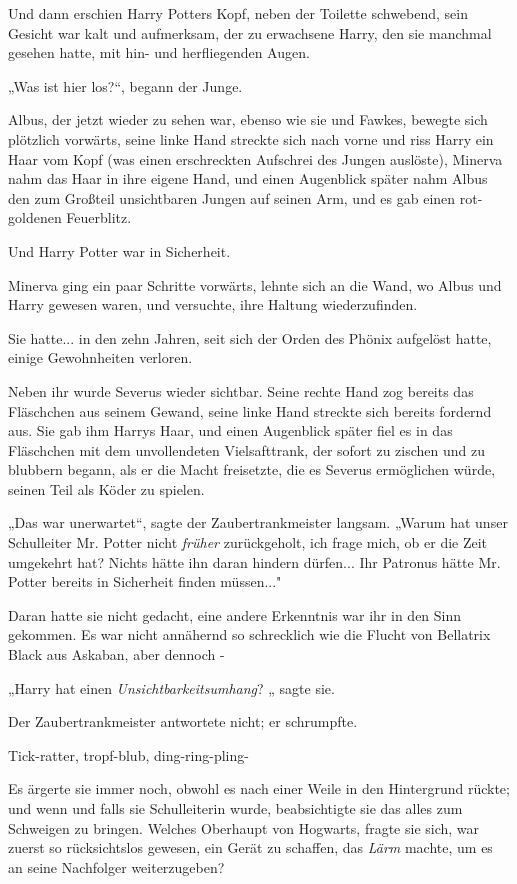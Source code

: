 {Und dann erschien Harry Potters Kopf, neben der Toilette schwebend, sein Gesicht war kalt und aufmerksam, der zu erwachsene Harry, den sie manchmal gesehen hatte, mit hin- und herfliegenden Augen.

„Was ist hier los?“, begann der Junge.

Albus, der jetzt wieder zu sehen war, ebenso wie sie und Fawkes, bewegte sich plötzlich vorwärts, seine linke Hand streckte sich nach vorne und riss Harry ein Haar vom Kopf (was einen erschreckten Aufschrei des Jungen auslöste), Minerva nahm das Haar in ihre eigene Hand, und einen Augenblick später nahm Albus den zum Großteil unsichtbaren Jungen auf seinen Arm, und es gab einen rot-goldenen Feuerblitz.

Und Harry Potter war in Sicherheit.

Minerva ging ein paar Schritte vorwärts, lehnte sich an die Wand, wo Albus und Harry gewesen waren, und versuchte, ihre Haltung wiederzufinden.

Sie hatte... in den zehn Jahren, seit sich der Orden des Phönix aufgelöst hatte, einige Gewohnheiten verloren.

Neben ihr wurde Severus wieder sichtbar. Seine rechte Hand zog bereits das Fläschchen aus seinem Gewand, seine linke Hand streckte sich bereits fordernd aus. Sie gab ihm Harrys Haar, und einen Augenblick später fiel es in das Fläschchen mit dem unvollendeten Vielsafttrank, der sofort zu zischen und zu blubbern begann, als er die Macht freisetzte, die es Severus ermöglichen würde, seinen Teil als Köder zu spielen.

„Das war unerwartet“, sagte der Zaubertrankmeister langsam. „Warum hat unser Schulleiter Mr. Potter nicht \emph{früher} zurückgeholt, ich frage mich, ob er die Zeit umgekehrt hat? Nichts hätte ihn daran hindern dürfen... Ihr Patronus hätte Mr. Potter bereits in Sicherheit finden müssen..."

Daran hatte sie nicht gedacht, eine andere Erkenntnis war ihr in den Sinn gekommen. Es war nicht annähernd so schrecklich wie die Flucht von Bellatrix Black aus Askaban, aber dennoch -

„Harry hat einen \emph{Unsichtbarkeitsumhang}? „ sagte sie.

Der Zaubertrankmeister antwortete nicht; er schrumpfte.

Tick-ratter, tropf-blub, ding-ring-pling-

Es ärgerte sie immer noch, obwohl es nach einer Weile in den Hintergrund rückte; und wenn und falls sie Schulleiterin wurde, beabsichtigte sie das alles zum Schweigen zu bringen. Welches Oberhaupt von Hogwarts, fragte sie sich, war zuerst so rücksichtslos gewesen, ein Gerät zu schaffen, das \emph{Lärm} machte, um es an seine Nachfolger weiterzugeben?

}
